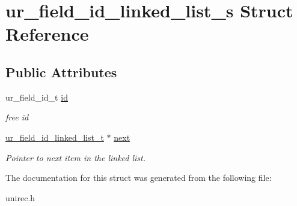 \hypertarget{structur__field__id__linked__list__s}{}\section{ur\+\_\+field\+\_\+id\+\_\+linked\+\_\+list\+\_\+s Struct Reference}
\label{structur__field__id__linked__list__s}
\subsection*{Public Attributes}
\begin{DoxyCompactItemize}
\item 
ur\+\_\+field\+\_\+id\+\_\+t \hyperlink{structur__field__id__linked__list__s_aeec4a18f3a649f048dfed57180789a8e}{id}\hypertarget{structur__field__id__linked__list__s_aeec4a18f3a649f048dfed57180789a8e}{}\label{structur__field__id__linked__list__s_aeec4a18f3a649f048dfed57180789a8e}

\begin{DoxyCompactList}\small\item\em free id \end{DoxyCompactList}\item 
\hyperlink{structur__field__id__linked__list__s}{ur\+\_\+field\+\_\+id\+\_\+linked\+\_\+list\+\_\+t} $\ast$ \hyperlink{structur__field__id__linked__list__s_a6f72cc714b8b99acc05490c5ac5a4507}{next}\hypertarget{structur__field__id__linked__list__s_a6f72cc714b8b99acc05490c5ac5a4507}{}\label{structur__field__id__linked__list__s_a6f72cc714b8b99acc05490c5ac5a4507}

\begin{DoxyCompactList}\small\item\em Pointer to next item in the linked list. \end{DoxyCompactList}\end{DoxyCompactItemize}


The documentation for this struct was generated from the following file\+:\begin{DoxyCompactItemize}
\item 
unirec.\+h\end{DoxyCompactItemize}
